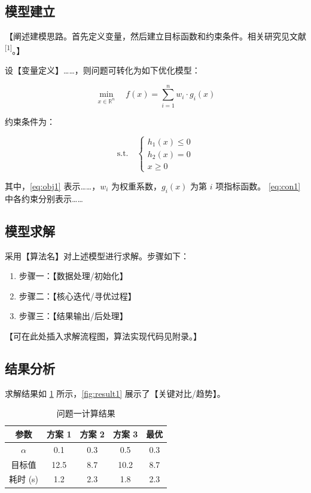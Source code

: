 \documentclass[withoutpreface,bwprint]{cumcmthesis}
\newcommand{\scite}[1]{\textsuperscript{[#1]}}
\begin{document}
\subsection{模型建立}

【阐述建模思路。首先定义变量，然后建立目标函数和约束条件。相关研究见文献\scite{1}。】

设【变量定义】……，则问题可转化为如下优化模型：

\begin{equation}
    \min_{x \in \mathbb{R}^n} \quad f(x) = \sum_{i=1}^{n} w_i \cdot g_i(x)
    \label{eq:obj1}
\end{equation}

约束条件为：

\begin{equation}
    \text{s.t.} \quad
    \begin{cases}
        h_1(x) \leq 0 \\
        h_2(x) = 0    \\
        x \geq 0
    \end{cases}
    \label{eq:con1}
\end{equation}

其中，\cref{eq:obj1} 表示……，$w_i$ 为权重系数，$g_i(x)$ 为第 $i$ 项指标函数。
\cref{eq:con1} 中各约束分别表示……

\subsection{模型求解}

采用【算法名】对上述模型进行求解。步骤如下：

\begin{enumerate}
    \item 步骤一：【数据处理/初始化】
    \item 步骤二：【核心迭代/寻优过程】
    \item 步骤三：【结果输出/后处理】
\end{enumerate}

【可在此处插入求解流程图，算法实现代码见附录。】

\subsection{结果分析}

求解结果如 \cref{tab:result1} 所示，\cref{fig:result1} 展示了【关键对比/趋势】。

{\renewcommand{\arraystretch}{1.38}
\setlength{\tabcolsep}{6pt}
\begin{longtable}{ccccc}
    \caption{问题一计算结果}\label{tab:result1}\\
    \toprule[1.5pt]
    参数       & 方案 1 & 方案 2 & 方案 3 & 最优  \\
    \midrule[1pt]
    \endfirsthead
    \endhead
    \bottomrule[1.5pt]
    \endlastfoot
    $\alpha$ & 0.1  & 0.3  & 0.5  & 0.3 \\
    目标值      & 12.5 & 8.7  & 10.2 & 8.7 \\
    耗时 (s)   & 1.2  & 2.3  & 1.8  & 2.3 \\
\end{longtable}}
\end{document}
